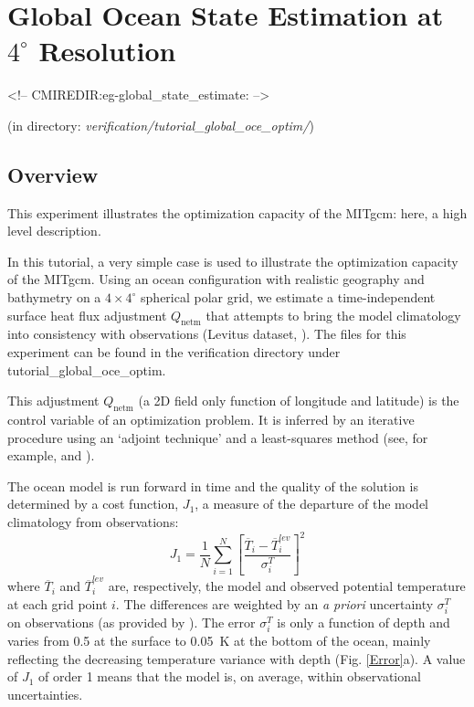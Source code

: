 
\section[Global Ocean State Estimation Example]{Global Ocean State Estimation at $4^\circ$ Resolution}
\label{sec:eg-global_state_estimate}
\begin{rawhtml}
<!-- CMIREDIR:eg-global_state_estimate: -->
\end{rawhtml}
\begin{center}
(in directory: {\it verification/tutorial\_global\_oce\_optim/})
\end{center}

\subsection{Overview}

This experiment illustrates the optimization capacity of the MITgcm: here,
a high level description.

In this tutorial, a very simple case is used to illustrate the optimization
capacity of the MITgcm. Using an ocean configuration with realistic geography
and bathymetry on a $4\times4^\circ$ spherical polar grid, we estimate a
time-independent surface heat flux adjustment $Q_\mathrm{netm}$ that attempts
to bring the model climatology into consistency with observations (Levitus
dataset, \cite{lev:94a}). The files for this experiment can be found in the
verification directory under tutorial\_global\_oce\_optim.

This adjustment $Q_\mathrm{netm}$ (a 2D field only function of longitude and
latitude) is the control variable of an optimization problem. It is inferred
by an iterative procedure using an `adjoint technique' and a least-squares
method (see, for example, \cite{stam-etal:02} and \cite{fer-eta:05}).

The ocean model is run forward in time and the quality of the solution is
determined by a cost function, $J_1$, a measure of the departure of the model
climatology from observations:
\begin{equation}\label{cost_temp}
J_1=\frac{1}{N}\sum_{i=1}^N \left[ \frac{\overline{T}_i-\overline{T}_i^{lev}}{\sigma_i^T}\right]^2
\end{equation}
where $\overline{T}_i$ and $\overline{T}_i^{lev}$ are, respectively, the model
and observed potential temperature at each
grid point $i$. The differences are weighted by an {\it a priori} uncertainty
$\sigma_i^T$ on observations (as provided by \cite{lev:94a}). The error
$\sigma_i^T$ is only a function of depth and varies from 0.5 at the surface to
0.05~K at the bottom of the ocean, mainly reflecting the decreasing
temperature variance with depth (Fig. \ref{Error}a). A value of $J_1$ of
order 1 means that the model is, on average, within observational
uncertainties.

